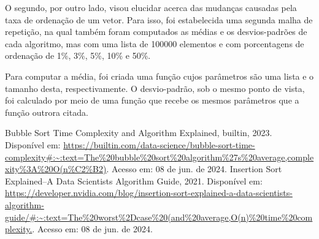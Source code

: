\documentclass[10pt,a4paper]{article}
\begin{document}
    O segundo, por outro lado, visou elucidar acerca das mudanças causadas pela taxa de ordenação de um vetor.
    Para isso, foi estabelecida uma segunda malha de repetição, na qual também foram computados as médias e os desvios-padrões de cada algoritmo, mas com uma lista de 100000 elementos e com porcentagens de ordenação de 1\%, 3\%, 5\%, 10\% e 50\%.
    

    Para computar a média, foi criada uma função cujos parâmetros são uma lista e o tamanho desta, respectivamente. O desvio-padrão, sob o mesmo ponto de vista, foi calculado por meio de uma função que recebe os mesmos parâmetros que a função outrora citada.
    


\newpage
\tableofcontents










\newpage
\begin{thebibliography}{3}
    Bubble Sort Time Complexity and Algorithm Explained, builtin, 2023. Disponível em: \url{https://builtin.com/data-science/bubble-sort-time-complexity#:~:text=The%20bubble%20sort%20algorithm%27s%20average,complexity%3A%20O(n%C2%B2)}. Acesso em: 08 de jun. de 2024.
    Insertion Sort Explained–A Data Scientists Algorithm Guide, 2021. Disponível em: \url{https://developer.nvidia.com/blog/insertion-sort-explained-a-data-scientists-algorithm-guide/#:~:text=The%20worst%2Dcase%20(and%20average,O(n)%20time%20complexity.}. Acesso em: 08 de jun. de 2024.
\end{thebibliography}
\end{document}
